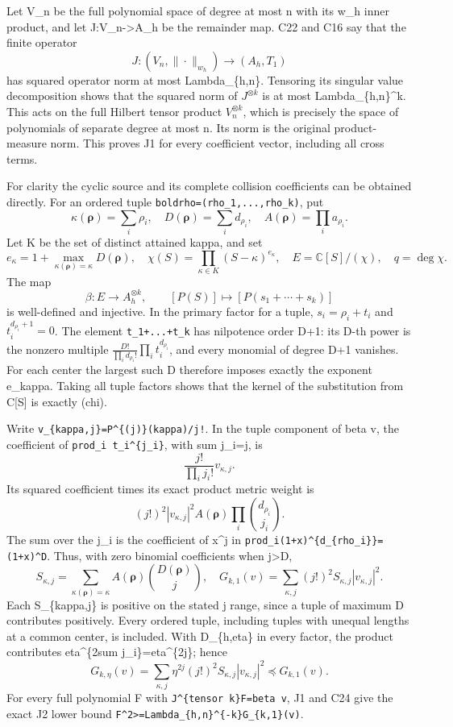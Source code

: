 \documentclass[11pt]{article}
\begin{document}
Let V\_n be the full polynomial space of degree at most n with its w\_h inner product, and let J:V\_n-\textgreater A\_h be the remainder map. C22 and C16 say that the finite operator \[
J:(V_n,\|\cdot\|_{w_h})\longrightarrow(A_h,T_1)
\] has squared operator norm at most Lambda\_\{h,n\}. Tensoring its singular value decomposition shows that the squared norm of \(J^{\otimes k}\) is at most Lambda\_\{h,n\}\^{}k. This acts on the full Hilbert tensor product \(V_n^{\otimes k}\), which is precisely the space of polynomials of separate degree at most n. Its norm is the original product-measure norm. This proves J1 for every coefficient vector, including all cross terms.

For clarity the cyclic source and its complete collision coefficients can be obtained directly. For an ordered tuple \texttt{boldrho=(rho\_1,...,rho\_k)}, put \[
\kappa(\boldsymbol\rho)=\sum_i\rho_i,\quad
D(\boldsymbol\rho)=\sum_i d_{\rho_i},\quad
A(\boldsymbol\rho)=\prod_i a_{\rho_i}.
\] Let K be the set of distinct attained kappa, and set \[
e_\kappa=1+\max_{\kappa(\boldsymbol\rho)=\kappa}D(\boldsymbol\rho),
\quad \chi(S)=\prod_{\kappa\in K}(S-\kappa)^{e_\kappa},
\quad E=\mathbb C[S]/(\chi),\quad q=\deg\chi.
\] The map \[
\beta:E\longrightarrow A_h^{\otimes k},\qquad
[P(S)]\longmapsto[P(s_1+\cdots+s_k)]
\tag{C23}
\] is well-defined and injective. In the primary factor for a tuple, \(s_i=\rho_i+t_i\) and \(t_i^{d_{\rho_i}+1}=0\). The element \texttt{t\_1+...+t\_k} has nilpotence order D+1: its D-th power is the nonzero multiple \(\displaystyle\frac{D!}{\prod_i d_{\rho_i}!}\prod_i t_i^{d_{\rho_i}}\), and every monomial of degree D+1 vanishes. For each center the largest such D therefore imposes exactly the exponent e\_kappa. Taking all tuple factors shows that the kernel of the substitution from C{[}S{]} is exactly (chi).

Write \texttt{v\_\{kappa,j\}=P\^{}\{(j)\}(kappa)/j!}. In the tuple component of beta v, the coefficient of \texttt{prod\_i\ t\_i\^{}\{j\_i\}}, with sum j\_i=j, is \[
\frac{j!}{\prod_i j_i!}v_{\kappa,j}.
\] Its squared coefficient times its exact product metric weight is \[
(j!)^2 |v_{\kappa,j}|^2 A(\boldsymbol\rho)
 \prod_i\binom{d_{\rho_i}}{j_i}.
\] The sum over the j\_i is the coefficient of x\^{}j in \texttt{prod\_i(1+x)\^{}\{d\_\{rho\_i\}\}=(1+x)\^{}D}. Thus, with zero binomial coefficients when j\textgreater D, \[
S_{\kappa,j}=\sum_{\kappa(\boldsymbol\rho)=\kappa}
A(\boldsymbol\rho)\binom{D(\boldsymbol\rho)}j,
\quad
G_{k,1}(v)=\sum_{\kappa,j}(j!)^2S_{\kappa,j}|v_{\kappa,j}|^2.
\tag{C24}
\] Each S\_\{kappa,j\} is positive on the stated j range, since a tuple of maximum D contributes positively. Every ordered tuple, including tuples with unequal lengths at a common center, is included. With D\_\{h,eta\} in every factor, the product contributes eta\^{}\{2sum j\_i\}=eta\^{}\{2j\}; hence \[
G_{k,\eta}(v)=\sum_{\kappa,j}\eta^{2j}(j!)^2S_{\kappa,j}|v_{\kappa,j}|^2
\preceq G_{k,1}(v).
\tag{C25}
\] For every full polynomial F with \texttt{J\^{}\{tensor\ k\}F=beta\ v}, J1 and C24 give the exact J2 lower bound \texttt{\textbar{}\textbar{}F\textbar{}\textbar{}\^{}2\textgreater{}=Lambda\_\{h,n\}\^{}\{-k\}G\_\{k,1\}(v)}.
\end{document}
